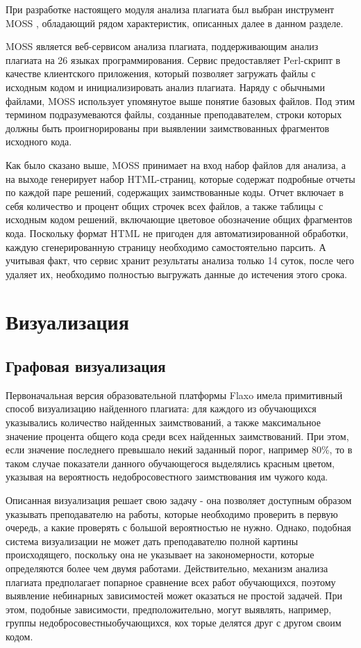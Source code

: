 \documentclass{article}
\begin{document}
При разработке настоящего модуля анализа плагиата был выбран инструмент MOSS \citep{mossOriginalPaper}, обладающий рядом характеристик, описанных далее в данном разделе.

MOSS является веб-сервисом анализа плагиата, поддерживающим анализ плагиата на 26 языках программирования. Сервис предоставляет Perl-скрипт в качестве клиентского приложения, который позволяет загружать файлы с исходным кодом и инициализировать анализ плагиата. Наряду с обычными файлами, MOSS использует упомянутое выше понятие базовых файлов. Под этим термином подразумеваются файлы, созданные преподавателем, строки которых должны быть проигнорированы при выявлении заимствованных фрагментов исходного кода.

Как было сказано выше, MOSS принимает на вход набор файлов для анализа, а на выходе генерирует набор HTML-страниц, которые содержат подробные отчеты по каждой паре решений, содержащих заимствованные коды. Отчет включает в себя количество и процент общих строчек всех файлов, а также таблицы с исходным кодом решений, включающие цветовое обозначение общих фрагментов кода. Поскольку формат HTML не пригоден для автоматизированной обработки, каждую сгенерированную страницу необходимо самостоятельно парсить. А учитывая факт, что сервис хранит результаты анализа только 14 суток, после чего удаляет их, необходимо полностью выгружать данные до истечения этого срока.

\section{Визуализация}

\subsection{Графовая визуализация}

Первоначальная версия образовательной платформы Flaxo имела примитивный способ визуализацию найденного плагиата: для каждого из обучающихся указывались количество найденных заимствований, а также максимальное значение процента общего кода среди всех найденных заимствований. При этом, если значение последнего превышало некий заданный порог, например 80\%, то в таком случае показатели данного обучающегося выделялись красным цветом, указывая на вероятность недобросовестного заимствования им чужого кода.

Описанная визуализация решает свою задачу - она позволяет доступным образом указывать преподавателю на работы, которые необходимо проверить в первую очередь, а какие проверять с большой вероятностью не нужно. Однако, подобная система визуализации не может дать преподавателю полной картины происходящего, поскольку она не указывает на закономерности, которые определяются более чем двумя работами. Действительно, механизм анализа плагиата предполагает попарное сравнение всех работ обучающихся, поэтому выявление небинарных зависимостей может оказаться не простой задачей. При этом, подобные зависимости, предположительно, могут выявлять, например, группы недобросовестныобучающихся, кох торые делятся друг с другом своим кодом.
\end{document}

